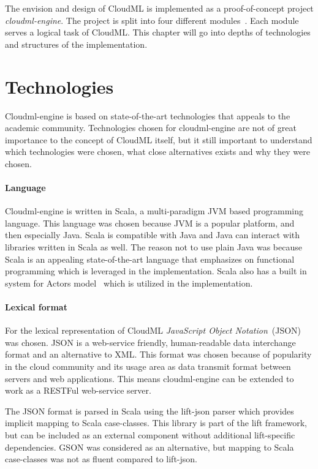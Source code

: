 



The envision and design of CloudML is implemented as a proof-of-concept project \emph{cloudml-engine}.
The project is split into four different modules~. 
Each module serves a logical task of CloudML.
This chapter will go into depths of technologies and structures of the implementation.

\section{Technologies}

Cloudml-engine is based on state-of-the-art technologies that appeals to the academic community.
Technologies chosen for cloudml-engine are not of great importance to the concept of CloudML itself,
but it still important to understand which technologies were chosen, what close alternatives exists
and why they were chosen.

\paragraph{Language} 
Cloudml-engine is written in Scala, a multi-paradigm JVM based programming language.
This language was chosen because JVM is a popular platform, and then especially Java.
Scala is compatible with Java and Java can interact with libraries written in Scala as well.
The reason not to use plain Java was because Scala is an appealing state-of-the-art language that emphasizes 
on functional programming which is leveraged in the implementation.
Scala also has a built in system for Actors model~\cite{actors:haller07} which is utilized in the implementation.

\paragraph{Lexical format}
For the lexical representation of CloudML \emph{JavaScript Object Notation}~(JSON) was chosen.
JSON is a web-service friendly, human-readable data interchange format and an alternative to XML.
This format was chosen because of popularity in the cloud community 
and its usage area as data transmit format between servers and web applications.
This means cloudml-engine can be extended to work as a RESTFul web-service server.

The JSON format is parsed in Scala using the lift-json parser which provides implicit
mapping to Scala case-classes. This library is part of the lift framework,
but can be included as an external component without additional lift-specific dependencies.
GSON was considered as an alternative, but mapping to Scala case-classes was not as 
fluent compared to lift-json.

